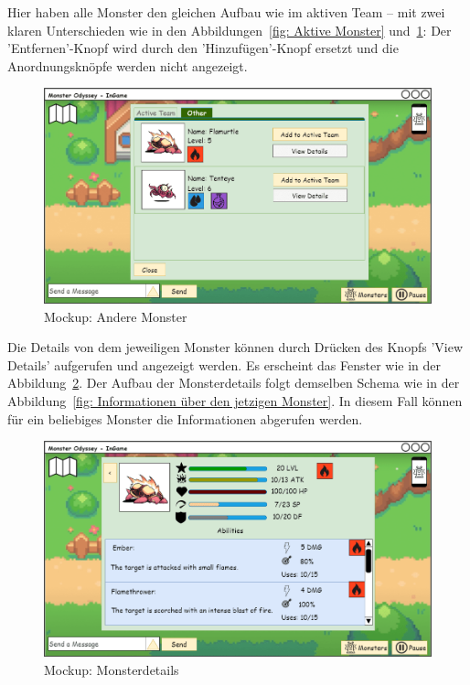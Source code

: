 Hier haben alle Monster den gleichen Aufbau wie im aktiven Team -- mit zwei klaren Unterschieden wie in den Abbildungen~\ref{fig: Aktive Monster} und~\ref{fig: Andere Monster}: Der 'Entfernen'-Knopf wird durch den 'Hinzufügen'-Knopf ersetzt und die Anordnungsknöpfe werden nicht angezeigt.
\begin{figure}[H]
    \center
    \includegraphics[scale=\scale]{images/mockups/Monster/IngameMonster.png}
    \caption{Mockup: Andere Monster}
    \label{fig: Andere Monster}
\end{figure}
Die Details von dem jeweiligen Monster können durch Drücken des Knopfs 'View Details' aufgerufen und angezeigt werden. Es erscheint das Fenster wie in der Abbildung~\ref{fig: Monsterdetails}. Der Aufbau der Monsterdetails folgt demselben Schema wie in der Abbildung~\ref{fig: Informationen über den jetzigen Monster}. In diesem Fall können für ein beliebiges Monster die Informationen abgerufen werden.
\begin{figure}[H]
    \center
    \includegraphics[scale=\scale]{images/mockups/Monster/IngameMonsterDetails.png}
    \caption{Mockup: Monsterdetails}
    \label{fig: Monsterdetails}
\end{figure}
